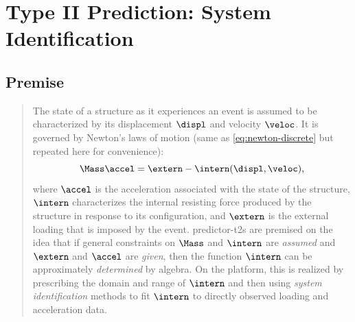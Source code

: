 \chapter{Type II Prediction: System Identification}\label{ch:predictor_t2}

\section{Premise}

\begin{quote}
\noindent
The state of a structure as it experiences an event is assumed to be characterized by its displacement $\displ$ and velocity $\veloc$. It is governed by Newton's laws of motion (same as \eqref{eq:newton-discrete} but repeated here for convenience):
\begin{equation*}
    \Mass \accel = \extern -  \intern(\displ,\veloc), %
\end{equation*}
where $\accel$ is the acceleration associated with the state of the structure, $\intern$ characterizes the internal resisting force produced by the structure in response to its configuration, and $\extern$ is the external loading that is imposed by the event. \glspl{predictor-t2} are premised on the idea that if general constraints on $\Mass$ and $\intern$ are \emph{assumed} and $\extern$ and $\accel$ are \emph{given}, then the function $\intern$ can be approximately \emph{determined} by algebra.
%
On the \gls{platform}, this is realized by prescribing the domain and range of $\intern$ and then using \emph{system identification} methods to fit $\intern$ to directly observed loading and acceleration data.
\end{quote}


